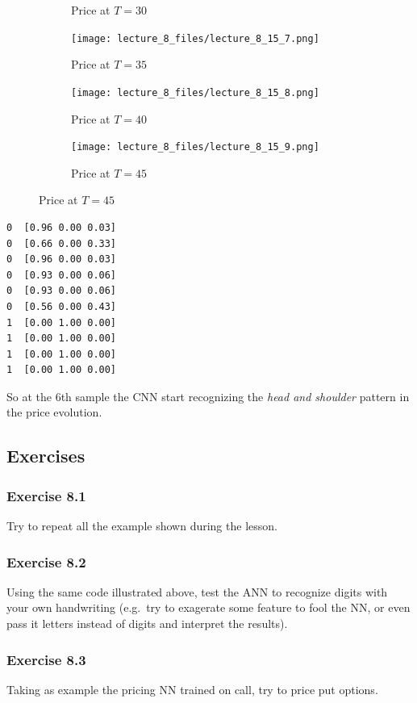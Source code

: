 \documentclass[11pt]{article}
\begin{document}
\begin{figure}
\begin{subfigure}{.45\textwidth}
    \caption{Price at $T=30$}
  \end{subfigure}
  \begin{subfigure}{.45\textwidth}
    \centering    
    \texttt{[image: lecture\_8\_files/lecture\_8\_15\_7.png]}
    \caption{Price at $T=35$}    
  \end{subfigure}
  \newline
  \begin{subfigure}{.45\textwidth}
    \centering
    \texttt{[image: lecture\_8\_files/lecture\_8\_15\_8.png]}
    \caption{Price at $T=40$}
  \end{subfigure}
  \begin{subfigure}{.45\textwidth}
    \centering    
    \texttt{[image: lecture\_8\_files/lecture\_8\_15\_9.png]}
    \caption{Price at $T=45$}    
  \end{subfigure}
\end{figure}
\newpage
    \begin{Verbatim}[commandchars=\\\{\}]
0  [0.96 0.00 0.03]
0  [0.66 0.00 0.33]
0  [0.96 0.00 0.03]
0  [0.93 0.00 0.06]
0  [0.93 0.00 0.06]
0  [0.56 0.00 0.43]
1  [0.00 1.00 0.00]
1  [0.00 1.00 0.00]
1  [0.00 1.00 0.00]
1  [0.00 1.00 0.00]
    \end{Verbatim}

    So at the 6th sample the CNN start recognizing the \emph{head and
shoulder} pattern in the price evolution.

    \hypertarget{exercises}{%
\subsection{Exercises}\label{exercises}}

\hypertarget{exercise-8.1}{%
\subsubsection{Exercise 8.1}\label{exercise-8.1}}

Try to repeat all the example shown during the lesson.

\hypertarget{exercise-8.2}{%
\subsubsection{Exercise 8.2}\label{exercise-8.2}}

Using the same code illustrated above, test the ANN to recognize digits
with your own handwriting (e.g.~try to exagerate some feature to fool
the NN, or even pass it letters instead of digits and interpret the
results).

\hypertarget{exercise-8.3}{%
\subsubsection{Exercise 8.3}\label{exercise-8.3}}

Taking as example the pricing NN trained on call, try to price put
options.


    
    
    
\end{document}

